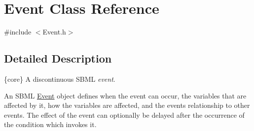 \hypertarget{class_event}{}\section{Event Class Reference}
\label{class_event}


{\ttfamily \#include $<$Event.\+h$>$}



\subsection{Detailed Description}
\{core\} A discontinuous S\+B\+ML {\itshape event}.

An S\+B\+ML \hyperlink{class_event}{Event} object defines when the event can occur, the variables that are affected by it, how the variables are affected, and the event\textquotesingle{}s relationship to other events. The effect of the event can optionally be delayed after the occurrence of the condition which invokes it.

